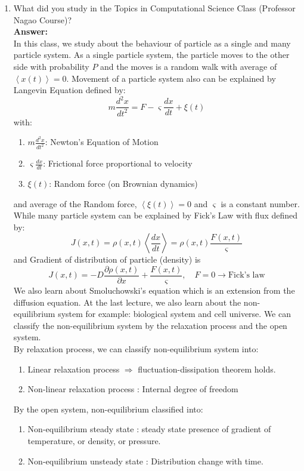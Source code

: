 \documentclass[a4paper,12pt]{article}
\begin{document}
\begin{enumerate}
	\item What did you study in the Topics in Computational Science Class (Professor Nagao Course)?\\
	\textbf{Answer:}\\
	In this class, we study about the behaviour of particle as a single and many particle system. As a single particle system, the particle moves to the other side with probability $P$ and the moves is a random walk with average of $\left< x(t) \right> = 0$. Movement of a particle system also can be explained by Langevin Equation defined by:
	\begin{equation}
	m \frac{d^2x}{dt^2} = F - \varsigma \frac{dx}{dt} + \xi (t)
	\end{equation}
	with:
	\begin{enumerate}
		\item $m \frac{d^2x}{dt^2}$: Newton's Equation of Motion
		\item $\varsigma \frac{dx}{dt}$: Frictional force proportional to velocity
		\item $\xi (t)$: Random force (on Brownian dynamics)
	\end{enumerate}
and average of the Random force, $\left< \xi(t) \right> = 0$ and $\varsigma$ is a constant number. While many particle system can be explained by Fick's Law with flux defined by:
\begin{equation}
J(x,t) = \rho(x,t) \left< \frac{dx}{dt} \right> = \rho(x,t) \frac{F(x,t)}{\varsigma}
\end{equation}
and Gradient of distribution of particle (density) is
\begin{equation}
J(x,t) = -D \frac{\partial \rho(x,t)}{\partial x} + \frac{F(x,t)}{\varsigma}, \quad F=0\rightarrow \text{Fick's law}
\end{equation}
We also learn about Smoluchowski's equation which is an extension from the diffusion equation.  At the last lecture, we also learn about the non-equilibrium system for example: biological system and cell universe. We can classify the non-equilibrium system by the relaxation process and the open system.\\
By relaxation process, we can classify non-equilibrium system into:
\begin{enumerate}
	\item Linear relaxation process $\Rightarrow$ fluctuation-dissipation theorem holds.
	\item Non-linear relaxation process : Internal degree of freedom
\end{enumerate}
By the open system, non-equilibrium classified into:
\begin{enumerate}
	\item Non-equilibrium steady state : steady state presence of gradient of temperature, or density, or pressure.
	\item Non-equilibrium unsteady state : Distribution change with time.
\end{enumerate}
\end{enumerate}
\end{document}
